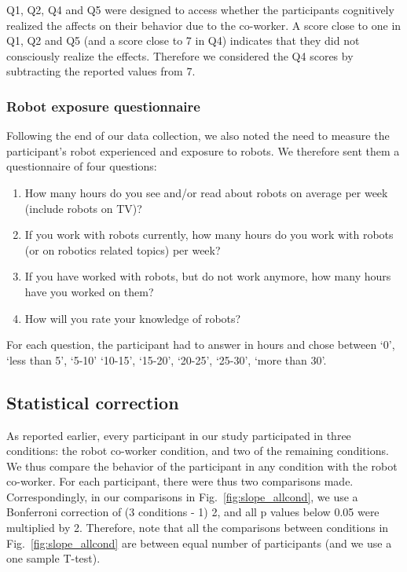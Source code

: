 Q1, Q2, Q4 and Q5 were designed to access whether the participants cognitively realized the affects on their behavior due to the co-worker. A score close to one in Q1, Q2 and Q5 (and a score close to 7 in Q4) indicates that they did not consciously realize the effects. Therefore we considered the Q4 scores by subtracting the reported values from 7.

\subsubsection{Robot exposure questionnaire}

Following the end of our data collection, we also noted the need to measure the participant's robot experienced and exposure to robots. We therefore sent them a questionnaire of four questions:

\begin{enumerate}[start=1,label={RQ\arabic*.}]
	\item How many hours do you see and/or read about robots on average per week (include robots on TV)?
	\item If you work with robots currently, how many hours do you work with robots (or on robotics related topics) per week?
	\item If you have worked with robots, but do not work anymore, how many hours have you worked on them?
	\item How will you rate your knowledge of robots?
\end{enumerate}

For each question, the participant had to answer in hours and chose between `0', `less than 5', `5-10' `10-15', `15-20', `20-25', `25-30', `more than 30'.


\subsection{Statistical correction}

As reported earlier, every participant in our study participated in three conditions: the robot co-worker condition, and two of the remaining conditions. We thus compare the behavior of the participant in any condition with the robot co-worker. For each participant, there were thus two comparisons made. Correspondingly, in our comparisons in Fig.~\ref{fig:slope_allcond}, we use a Bonferroni correction of (3 conditions - 1) 2, and all p values below 0.05 were multiplied by 2. Therefore, note that all the comparisons between conditions in Fig.~\ref{fig:slope_allcond} are between equal number of participants (and we use a one sample T-test).

